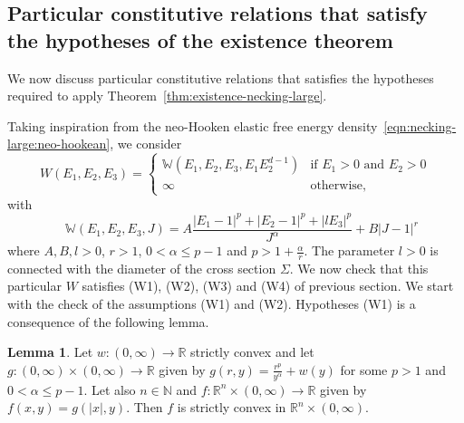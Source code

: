 \documentclass[a4paper,10pt,oneside]{amsbook}
\numberwithin{section}{chapter}
\numberwithin{equation}{chapter}
\theoremstyle{definition}
\newtheorem{lemma}[prop]{Lemma}
\begin{document}
\subsection{Particular constitutive relations that satisfy the hypotheses of the existence theorem}

\label{subsec:constitutive-large-neck}

We now discuss particular constitutive relations that satisfies the hypotheses required to apply Theorem~\ref{thm:existence-necking-large}.

Taking inspiration from the neo-Hooken elastic free energy density~\eqref{eqn:necking-large:neo-hookean}, we consider
\[
W(E_1,E_2,E_3)=
\begin{cases}
\mathbb{W}(E_1,E_2,E_3,E_1E_2^{d-1}) & \text{if $E_1>0$ and $E_2>0$} \\
\infty & \text{otherwise},
\end{cases}
\]
with
\[
\quad \mathbb{W}(E_1,E_2,E_3,J)=A\frac{|E_1-1|^p+|E_2-1|^p+|lE_3|^p}{J^\alpha}+B|J-1|^r
\]
where $A,B,l>0$, $r>1$, $0<\alpha\le p-1$ and $p>1+\frac{\alpha}{r}$. The parameter $l>0$ is connected with the diameter of the cross section $\Sigma$. We now check that this particular $W$ satisfies (W1), (W2), (W3) and (W4) of previous section. We start with the check of the assumptions (W1) and (W2). Hypotheses (W1) is a consequence of the following lemma.
\begin{lemma}
Let $w\colon(0,\infty)\to\mathbb{R}$ strictly convex and let $g\colon(0,\infty)\times(0,\infty)\to\mathbb{R}$ given by $g(r,y)=\frac{r^p}{y^\alpha}+w(y)$ for some $p>1$ and $0<\alpha\le p-1$. Let also $n\in\mathbb{N}$ and $f\colon\mathbb{R}^n\times(0,\infty)\to\mathbb{R}$ given by $f(x,y)=g(|x|,y)$. Then $f$ is strictly convex in $\mathbb{R}^n\times(0,\infty)$.
\end{lemma}
\end{document}
